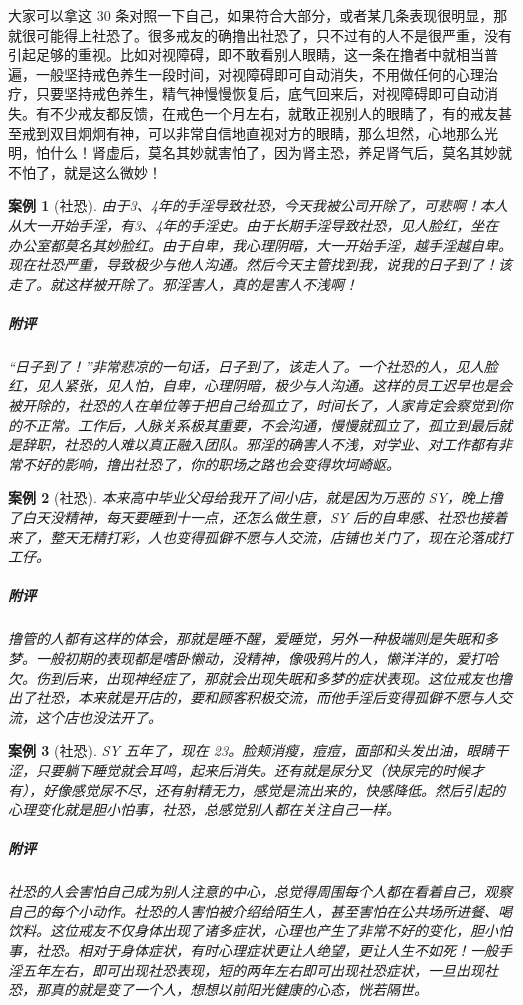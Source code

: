 \documentclass{ctexart}
\newtheorem{case}{案例}
\begin{document}
大家可以拿这 30 条对照一下自己，如果符合大部分，或者某几条表现很明显，那就很可能得上社恐了。很多戒友的确撸出社恐了，只不过有的人不是很严重，没有引起足够的重视。比如对视障碍，即不敢看别人眼睛，这一条在撸者中就相当普遍，一般坚持戒色养生一段时间，对视障碍即可自动消失，不用做任何的心理治疗，只要坚持戒色养生，精气神慢慢恢复后，底气回来后，对视障碍即可自动消失。有不少戒友都反馈，在戒色一个月左右，就敢正视别人的眼睛了，有的戒友甚至戒到双目炯炯有神，可以非常自信地直视对方的眼睛，那么坦然，心地那么光明，怕什么！肾虚后，莫名其妙就害怕了，因为肾主恐，养足肾气后，莫名其妙就不怕了，就是这么微妙！

\begin{case}[社恐]
    由于3、4年的手淫导致社恐，今天我被公司开除了，可悲啊！本人从大一开始手淫，有3、4年的手淫史。由于长期手淫导致社恐，见人脸红，坐在办公室都莫名其妙脸红。由于自卑，我心理阴暗，大一开始手淫，越手淫越自卑。现在社恐严重，导致极少与他人沟通。然后今天主管找到我，说我的日子到了！该走了。就这样被开除了。邪淫害人，真的是害人不浅啊！
    \subparagraph{附评} “日子到了！”非常悲凉的一句话，日子到了，该走人了。一个社恐的人，见人脸红，见人紧张，见人怕，自卑，心理阴暗，极少与人沟通。这样的员工迟早也是会被开除的，社恐的人在单位等于把自己给孤立了，时间长了，人家肯定会察觉到你的不正常。工作后，人脉关系极其重要，不会沟通，慢慢就孤立了，孤立到最后就是辞职，社恐的人难以真正融入团队。邪淫的确害人不浅，对学业、对工作都有非常不好的影响，撸出社恐了，你的职场之路也会变得坎坷崎岖。
\end{case}

\begin{case}[社恐]
    本来高中毕业父母给我开了间小店，就是因为万恶的 SY，晚上撸了白天没精神，每天要睡到十一点，还怎么做生意，SY 后的自卑感、社恐也接着来了，整天无精打彩，人也变得孤僻不愿与人交流，店铺也关门了，现在沦落成打工仔。
    \subparagraph{附评} 撸管的人都有这样的体会，那就是睡不醒，爱睡觉，另外一种极端则是失眠和多梦。一般初期的表现都是嗜卧懒动，没精神，像吸鸦片的人，懒洋洋的，爱打哈欠。伤到后来，出现神经症了，那就会出现失眠和多梦的症状表现。这位戒友也撸出了社恐，本来就是开店的，要和顾客积极交流，而他手淫后变得孤僻不愿与人交流，这个店也没法开了。
\end{case}

\begin{case}[社恐]
    SY 五年了，现在 23。脸颊消瘦，痘痘，面部和头发出油，眼睛干涩，只要躺下睡觉就会耳鸣，起来后消失。还有就是尿分叉（快尿完的时候才有），好像感觉尿不尽，还有射精无力，感觉是流出来的，快感降低。然后引起的心理变化就是胆小怕事，社恐，总感觉别人都在关注自己一样。
    \subparagraph{附评} 社恐的人会害怕自己成为别人注意的中心，总觉得周围每个人都在看着自己，观察自己的每个小动作。社恐的人害怕被介绍给陌生人，甚至害怕在公共场所进餐、喝饮料。这位戒友不仅身体出现了诸多症状，心理也产生了非常不好的变化，胆小怕事，社恐。相对于身体症状，有时心理症状更让人绝望，更让人生不如死！一般手淫五年左右，即可出现社恐表现，短的两年左右即可出现社恐症状，一旦出现社恐，那真的就是变了一个人，想想以前阳光健康的心态，恍若隔世。
\end{case}
\end{document}

